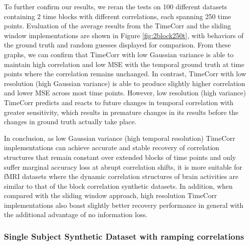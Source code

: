 \documentclass[11pt]{article}
\begin{document}
To further confirm our results, we reran the tests on 100 different datasets containing 2 time blocks with different correlations, each spanning 250 time points. Evaluation of the average results from the TimeCorr and the sliding window implementations are shown in Figure \ref{fig:2block250t}, with behaviors of the ground truth and random guesses displayed for comparison. From these graphs, we can confirm that TimeCorr with low Gaussian variance is able to maintain high correlation and low MSE with the temporal ground truth at time points where the correlation remains unchanged. In contrast, TimeCorr with low resolution (high Gaussian variance) is able to produce slightly higher correlation and lower MSE across most time points. However, low resolution (high variance) TimeCorr predicts and reacts to future changes in temporal correlation with greater sensitivity, which results in premature changes in its results before the changes in ground truth actually take place.

In conclusion, as low Gaussian variance (high temporal resolution) TimeCorr implementations can achieve accurate and stable recovery of correlation structures that remain constant over extended blocks of time points and only suffer marginal accuracy loss at abrupt correlation shifts, it is more suitable for fMRI datasets where the dynamic correlation structures of brain activities are similar to that of the block correlation synthetic datasets. In addition, when compared with the sliding window approach, high resolution TimeCorr implementations also boast slightly better recovery performance in general with the additional advantage of no information loss.

\subsubsection{Single Subject Synthetic Dataset with ramping correlations}
\end{document}
